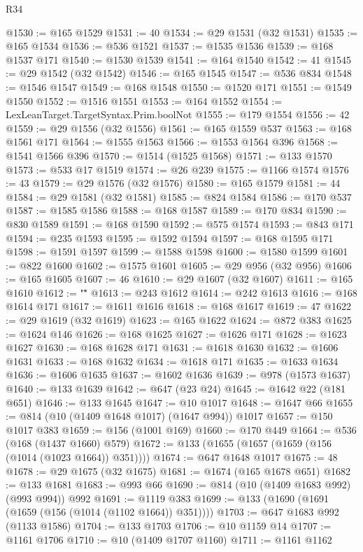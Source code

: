 \begin{lexlean}{R34}
\begin{coremodule}
@1530 := @165 @1529
@1531 := 40
@1534 := @29 @1531 (@32 @1531)
@1535 := @165 @1534
@1536 := @536 @1521
@1537 := @1535 @1536
@1539 := @168 @1537 @171
@1540 := @1530 @1539
@1541 := @164 @1540
@1542 := 41
@1545 := @29 @1542 (@32 @1542)
@1546 := @165 @1545
@1547 := @536 @834
@1548 := @1546 @1547
@1549 := @168 @1548
@1550 := @1520 @171
@1551 := @1549 @1550
@1552 := @1516 @1551
@1553 := @164 @1552
@1554 := LexLeanTarget.TargetSyntax.Prim.boolNot
@1555 := @179 @1554
@1556 := 42
@1559 := @29 @1556 (@32 @1556)
@1561 := @165 @1559 @537
@1563 := @168 @1561 @171
@1564 := @1555 @1563
@1566 := @1553 @1564 @396
@1568 := @1541 @1566 @396
@1570 := @1514 (@1525 @1568)
@1571 := @133 @1570
@1573 := @533 @17 @1519
@1574 := @26 @239
@1575 := @1166 @1574
@1576 := 43
@1579 := @29 @1576 (@32 @1576)
@1580 := @165 @1579
@1581 := 44
@1584 := @29 @1581 (@32 @1581)
@1585 := @824 @1584
@1586 := @170 @537
@1587 := @1585 @1586
@1588 := @168 @1587
@1589 := @170 @834
@1590 := @830 @1589
@1591 := @168 @1590
@1592 := @575 @1574
@1593 := @843 @171
@1594 := @235 @1593
@1595 := @1592 @1594
@1597 := @168 @1595 @171
@1598 := @1591 @1597
@1599 := @1588 @1598
@1600 := @1580 @1599
@1601 := @822 @1600
@1602 := @1575 @1601
@1605 := @29 @956 (@32 @956)
@1606 := @165 @1605
@1607 := 46
@1610 := @29 @1607 (@32 @1607)
@1611 := @165 @1610
@1612 := "\""
@1613 := @243 @1612
@1614 := @242 @1613
@1616 := @168 @1614 @171
@1617 := @1611 @1616
@1618 := @168 @1617
@1619 := 47
@1622 := @29 @1619 (@32 @1619)
@1623 := @165 @1622
@1624 := @872 @383
@1625 := @1624 @146
@1626 := @168 @1625
@1627 := @1626 @171
@1628 := @1623 @1627
@1630 := @168 @1628 @171
@1631 := @1618 @1630
@1632 := @1606 @1631
@1633 := @168 @1632
@1634 := @1618 @171
@1635 := @1633 @1634
@1636 := @1606 @1635
@1637 := @1602 @1636
@1639 := @978 (@1573 @1637)
@1640 := @133 @1639
@1642 := @647 (@23 @24)
@1645 := @1642 @22 (@181 @651)
@1646 := @133 @1645
@1647 := @10 @1017
@1648 := @1647 @66
@1655 := @814 (@10 (@1409 @1648 @1017) (@1647 @994)) @1017
@1657 := @150 @1017 @383
@1659 := @156 (@1001 @169)
@1660 := @170 @449
@1664 := @536 (@168 (@1437 @1660) @579)
@1672 := @133 (@1655 (@1657 (@1659 (@156 (@1014 (@1023 @1664)) @351))))
@1674 := @647 @1648 @1017
@1675 := 48
@1678 := @29 @1675 (@32 @1675)
@1681 := @1674 (@165 @1678 @651)
@1682 := @133 @1681
@1683 := @993 @66
@1690 := @814 (@10 (@1409 @1683 @992) (@993 @994)) @992
@1691 := @1119 @383
@1699 := @133 (@1690 (@1691 (@1659 (@156 (@1014 (@1102 @1664)) @351))))
@1703 := @647 @1683 @992 (@1133 @1586)
@1704 := @133 @1703
@1706 := @10 @1159 @14
@1707 := @1161 @1706
@1710 := @10 (@1409 @1707 @1160)
@1711 := @1161 @1162

\end{coremodule}
\end{lexlean}
